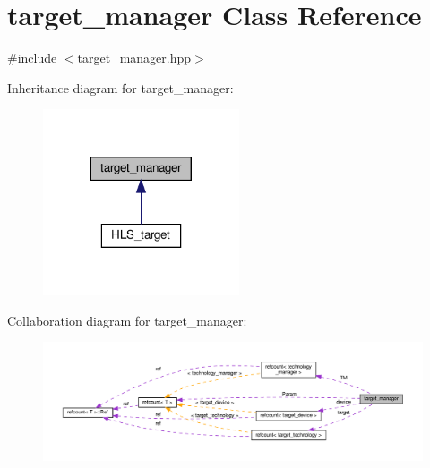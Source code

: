 \hypertarget{classtarget__manager}{}\section{target\+\_\+manager Class Reference}
\label{classtarget__manager}


{\ttfamily \#include $<$target\+\_\+manager.\+hpp$>$}



Inheritance diagram for target\+\_\+manager\+:
\nopagebreak
\begin{figure}[H]
\begin{center}
\leavevmode
\includegraphics[width=164pt]{db/d38/classtarget__manager__inherit__graph}
\end{center}
\end{figure}


Collaboration diagram for target\+\_\+manager\+:
\nopagebreak
\begin{figure}[H]
\begin{center}
\leavevmode
\includegraphics[width=350pt]{df/d1e/classtarget__manager__coll__graph}
\end{center}
\end{figure}
